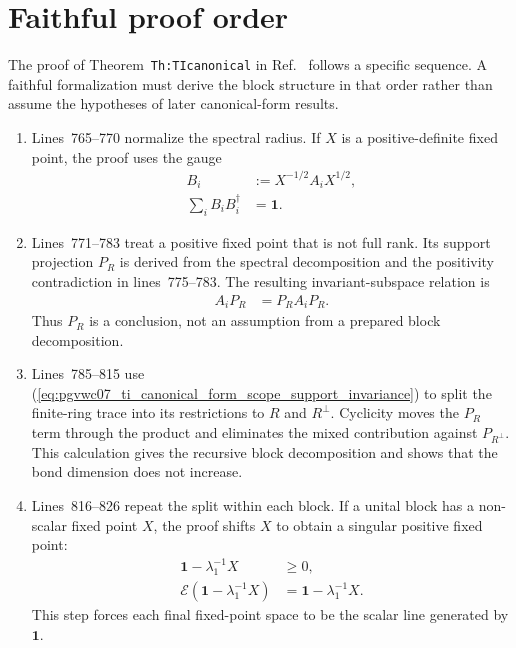 \documentclass{article}
\begin{document}
\section{Faithful proof order}

The proof of Theorem~\texttt{Th:TIcanonical} in
Ref.~\cite{PerezGarcia2007MPSReps} follows a specific sequence. A faithful
formalization must derive the block structure in that order rather than assume
the hypotheses of later canonical-form results.

\begin{enumerate}
    \item Lines~765--770 normalize the spectral radius. If $X$ is a
          positive-definite fixed point, the proof uses the gauge
          \begin{align}
              B_i
                  &:= X^{-1/2}A_iX^{1/2},
              \label{eq:pgvwc07_ti_canonical_form_scope_full_rank_gauge}\\
              \sum_i B_iB_i^\dagger
                  &= \mathbf{1}.
              \label{eq:pgvwc07_ti_canonical_form_scope_full_rank_unitality}
          \end{align}

    \item Lines~771--783 treat a positive fixed point that is not full rank.
          Its support projection $P_R$ is derived from the spectral
          decomposition and the positivity contradiction in lines~775--783.
          The resulting invariant-subspace relation is
          \begin{align}
              A_iP_R
                  &= P_RA_iP_R.
              \label{eq:pgvwc07_ti_canonical_form_scope_support_invariance}
          \end{align}
          Thus $P_R$ is a conclusion, not an assumption from a prepared block
          decomposition.

    \item Lines~785--815 use
          (\ref{eq:pgvwc07_ti_canonical_form_scope_support_invariance}) to
          split the finite-ring trace into its restrictions to $R$ and
          $R^\perp$. Cyclicity moves the $P_R$ term through the product and
          eliminates the mixed contribution against $P_{R^\perp}$. This
          calculation gives the recursive block decomposition and shows that
          the bond dimension does not increase.

    \item Lines~816--826 repeat the split within each block. If a unital block
          has a non-scalar fixed point $X$, the proof shifts $X$ to obtain a
          singular positive fixed point:
          \begin{align}
              \mathbf{1}-\lambda_1^{-1}X
                  &\geq 0,
              \label{eq:pgvwc07_ti_canonical_form_scope_fixed_point_shift}\\
              \mathcal{E}(\mathbf{1}-\lambda_1^{-1}X)
                  &= \mathbf{1}-\lambda_1^{-1}X.
              \label{eq:pgvwc07_ti_canonical_form_scope_shifted_fixed_point}
          \end{align}
          This step forces each final fixed-point space to be the scalar line
          generated by $\mathbf{1}$.


\end{enumerate}
\end{document}
